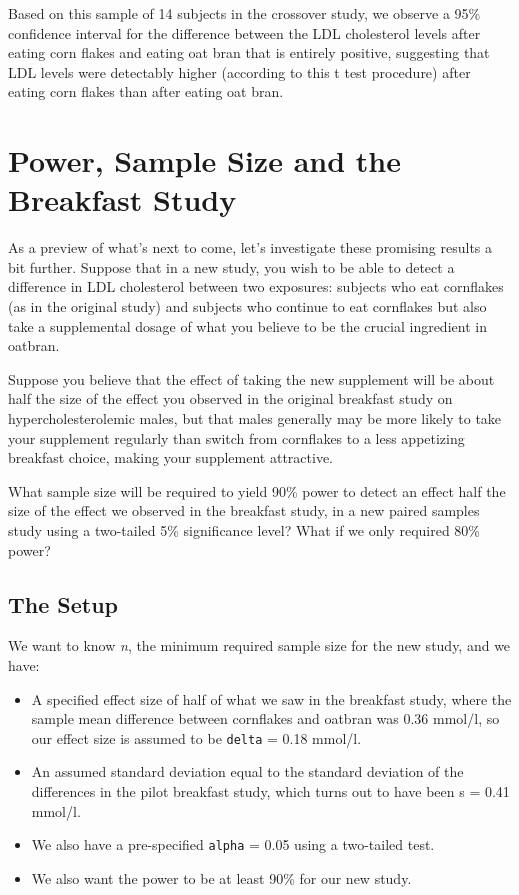 \documentclass[
]{book}
\providecommand{\tightlist}{%
  \setlength{\itemsep}{0pt}\setlength{\parskip}{0pt}}
\begin{document}
Based on this sample of 14 subjects in the crossover study, we observe a 95\% confidence interval for the difference between the LDL cholesterol levels after eating corn flakes and eating oat bran that is entirely positive, suggesting that LDL levels were detectably higher (according to this t test procedure) after eating corn flakes than after eating oat bran.

\hypertarget{power-sample-size-and-the-breakfast-study}{%
\section{Power, Sample Size and the Breakfast Study}\label{power-sample-size-and-the-breakfast-study}}

As a preview of what's next to come, let's investigate these promising results a bit further. Suppose that in a new study, you wish to be able to detect a difference in LDL cholesterol between two exposures: subjects who eat cornflakes (as in the original study) and subjects who continue to eat cornflakes but also take a supplemental dosage of what you believe to be the crucial ingredient in oatbran.

Suppose you believe that the effect of taking the new supplement will be about half the size of the effect you observed in the original breakfast study on hypercholesterolemic males, but that males generally may be more likely to take your supplement regularly than switch from cornflakes to a less appetizing breakfast choice, making your supplement attractive.

What sample size will be required to yield 90\% power to detect an effect half the size of the effect we observed in the breakfast study, in a new paired samples study using a two-tailed 5\% significance level? What if we only required 80\% power?

\hypertarget{the-setup}{%
\subsection{The Setup}\label{the-setup}}

We want to know \emph{n}, the minimum required sample size for the new study, and we have:

\begin{itemize}
\tightlist
\item
  A specified effect size of half of what we saw in the breakfast study, where the sample mean difference between cornflakes and oatbran was 0.36 mmol/l, so our effect size is assumed to be \texttt{delta} = 0.18 mmol/l.
\item
  An assumed standard deviation equal to the standard deviation of the differences in the pilot breakfast study, which turns out to have been s = 0.41 mmol/l.
\item
  We also have a pre-specified \texttt{alpha} = 0.05 using a two-tailed test.
\item
  We also want the power to be at least 90\% for our new study.
\end{itemize}
\end{document}
